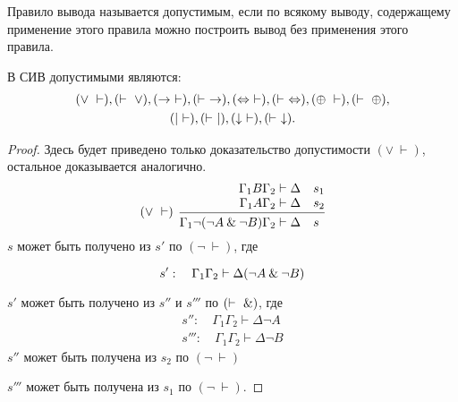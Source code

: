 \documentclass[main]{subfiles}
\begin{document}
\begin{definition}
    Правило вывода называется допустимым, если по всякому выводу, содержащему применение этого правила можно построить вывод без применения этого правила.
\end{definition}
\begin{proposition}
    В СИВ допустимыми являются:
    \begin{gather*}
        (\lor \ \vdash), (\vdash \ \lor), (\to \ \vdash), (\vdash \ \to), (\lra \ \vdash), (\vdash \ \lra), (\oplus \ \vdash), (\vdash\ \oplus),\\
        (\mid \ \vdash), (\vdash \ \mid), (\downarrow \ \vdash), (\vdash \ \downarrow).
    \end{gather*}
\end{proposition}
\begin{proof}
    Здесь будет приведено только доказательство допустимости $(\lor \ \vdash)$, остальное доказывается аналогично.
    \begin{gather*}
        \begin{prooftree}
            \hypo{\Gamma_1 B \Gamma_2 &\vdash \Delta \quad s_1 }
            \infer[no rule]1{\Gamma_1 A \Gamma_2 &\vdash \Delta \quad s_2}
            \infer[left label=$(\lor \ \vdash)$]1{\Gamma_1 \lnot (\lnot A \and \lnot B) \Gamma_2 &\vdash \Delta \quad s}
        \end{prooftree}
    \end{gather*}
    $s$ может быть получено из $s'$ по $(\lnot \ \vdash)$, где

    \[s' : \quad \Gamma_1 \Gamma_2 \vdash \Delta (\lnot A \mathbin{\&} \lnot B)\]

    $s'$ может быть получено из $s''$ и $s'''$ по $(\vdash \ \mathbin{\&})$, где
    \begin{gather*}
        s'': \quad \Gamma_1\Gamma_2 \vdash \Delta \lnot A\\
        s''' : \quad \Gamma_1\Gamma_2 \vdash \Delta \lnot B
    \end{gather*}
    $s''$ может быть получена из $s_2$ по $(\lnot \ \vdash)$

    $s'''$ может быть получена из $s_1$ по $(\lnot \ \vdash)$.
\end{proof}
\end{document}

